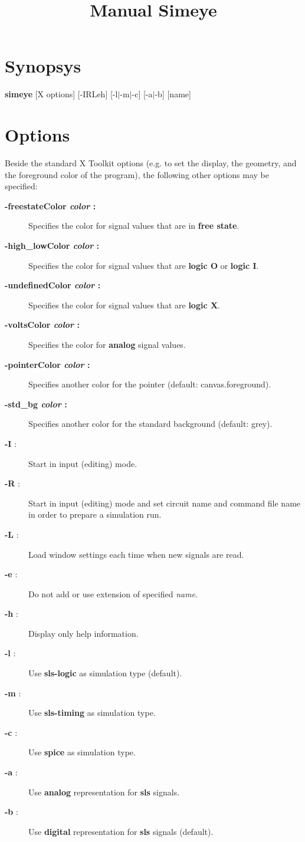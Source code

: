 \title{Manual Simeye} 
\maketitle

\section{Synopsys}
{\bf simeye}
[X options]  [-IRLeh]  [-l$|$-m$|$-c]  [-a$|$-b]  [name]

\section{Options}
Beside the standard X Toolkit options (e.g. to set the display,
the geometry, and the foreground color of the program),
the following other options may be specified:
\begin{description}
\item[{\bf -freestateColor {\it color} : }]
Specifies the color for signal values that are in {\bf free state}.
\item[{\bf -high\_lowColor {\it color} : }]
Specifies the color for signal values that are {\bf logic O} or {\bf logic I}.
\item[{\bf -undefinedColor {\it color} : }]
Specifies the color for signal values that are {\bf logic X}.
\item[{\bf -voltsColor {\it color} : }]
Specifies the color for {\bf analog} signal values.
\item[{\bf -pointerColor {\it color} : }]
Specifies another color for the pointer (default: canvas.foreground).
\item[{\bf -std\_bg {\it color} : }]
Specifies another color for the standard background (default: grey).
\item[{\bf -I} :]
Start  in input (editing) mode.
\item[{\bf -R} :]
Start  in input (editing) mode
and set circuit name and command file name
in order to prepare a simulation run.
\item[{\bf -L} :]
Load window settings each time when new signals are read.
\item[{\bf -e} :]
Do not add or use extension of specified {\it name}.
\item[{\bf -h} :]
Display only help information.
\item[{\bf -l} :]
Use {\bf sls-logic} as simulation type (default).
\item[{\bf -m} :]
Use {\bf sls-timing} as simulation type.
\item[{\bf -c} :]
Use {\bf spice} as simulation type.
\item[{\bf -a} :]
Use {\bf analog} representation for {\bf sls} signals.
\item[{\bf -b} :]
Use {\bf digital} representation for {\bf sls} signals 
(default).
\end{description}

